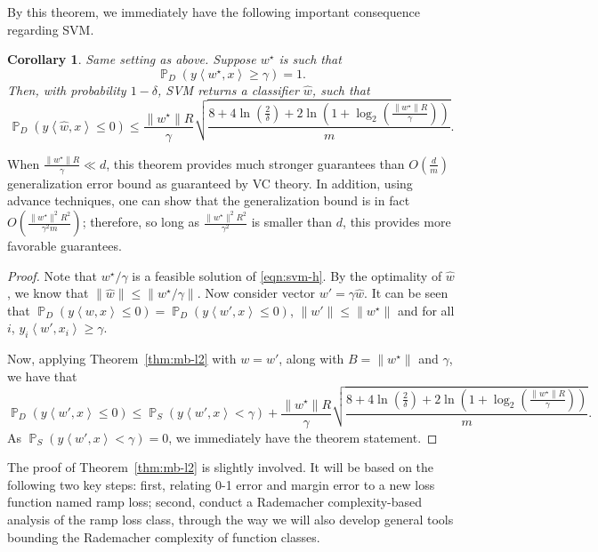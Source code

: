 \documentclass{article}
\newtheorem{corollary}{Corollary}
\DeclareMathOperator{\PP}{{\mathbb P}}
\newcommand{\inner}[2]{\left\langle #1,#2 \right\rangle}
\begin{document}
By this theorem, we immediately have the following
important consequence regarding SVM.
\begin{corollary}
Same setting as above. Suppose $w^\star$ is such that %
\[ \PP_{D}(y \inner{w^\star}{x} \geq \gamma) = 1. \]
Then, with probability $1-\delta$, SVM returns a classifier $\hat{w}$, such that
\[ \PP_D( y \inner{\hat{w}}{x} \leq 0 )
   \leq
   \frac{\|w^\star\|R}{\gamma} \sqrt{\frac{8 + 4\ln(\frac{2}{\delta}) + 2\ln(1+\log_2(\frac{\|w^\star\|R}{\gamma}))}{m}}.
 \]
\end{corollary}
When $\frac{\|w^\star\|R}{\gamma} \ll d$, this theorem provides much stronger guarantees than $O(\frac{d}{m})$ generalization error bound as guaranteed by VC theory.
In addition, using advance techniques, one can show that the generalization bound is in fact $O(\frac{\|w^\star\|^2R^2}{\gamma^2 m})$; therefore, so long as $\frac{\|w^\star\|^2R^2}{\gamma^2}$ is smaller than $d$, this provides more favorable guarantees.

\begin{proof}
Note that $w^\star / \gamma$ is a feasible solution of \ref{eqn:svm-h}. By the optimality of $\hat{w}$, we know that $\| \hat{w} \| \leq \| w^\star / \gamma \|$. Now consider vector $w' = \gamma \hat{w}$.
It can be seen that $\PP_D( y \inner{w}{x} \leq 0 ) = \PP_D( y \inner{w'}{x} \leq 0 )$, $\| w' \| \leq \| w^\star \|$ and for all $i$, $y_i \inner{w'}{x_i} \geq \gamma$.

Now, applying Theorem~\ref{thm:mb-l2} with $w = w'$, along with
$B = \| w^\star \|$ and $\gamma$, we have that
\[ \PP_D( y \inner{w'}{x} \leq 0 )
\leq \PP_S (y \inner{w'}{x} < \gamma) + \frac{\|w^\star\|R}{\gamma} \sqrt{\frac{8 + 4\ln(\frac{2}{\delta}) + 2\ln(1+\log_2(\frac{\|w^\star\|R}{\gamma}))}{m}}. \]
As $\PP_S (y \inner{w'}{x} < \gamma) = 0$, we immediately have the theorem statement.
\end{proof}

The proof of Theorem~\ref{thm:mb-l2} is slightly involved. It will be based on the following two key steps: first, relating 0-1 error and margin error to a new loss function named ramp loss; second, conduct a Rademacher complexity-based analysis of the ramp loss class, through the way we will also develop general tools bounding the Rademacher complexity of function classes.
\end{document}
